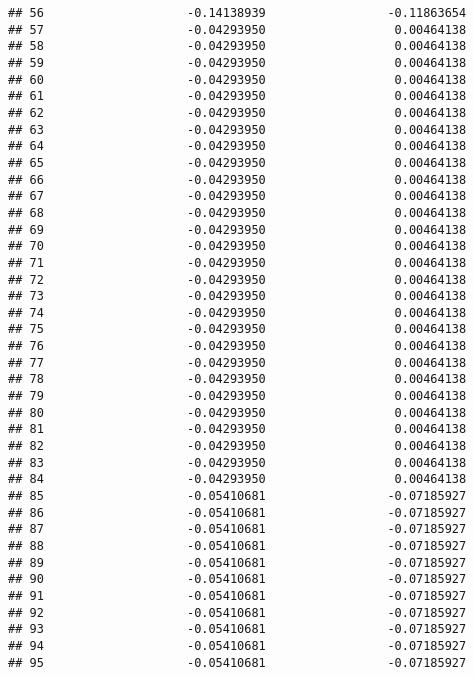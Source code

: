 \documentclass[]{article}
\begin{document}
\begin{verbatim}
## 56                    -0.14138939                 -0.11863654
## 57                    -0.04293950                  0.00464138
## 58                    -0.04293950                  0.00464138
## 59                    -0.04293950                  0.00464138
## 60                    -0.04293950                  0.00464138
## 61                    -0.04293950                  0.00464138
## 62                    -0.04293950                  0.00464138
## 63                    -0.04293950                  0.00464138
## 64                    -0.04293950                  0.00464138
## 65                    -0.04293950                  0.00464138
## 66                    -0.04293950                  0.00464138
## 67                    -0.04293950                  0.00464138
## 68                    -0.04293950                  0.00464138
## 69                    -0.04293950                  0.00464138
## 70                    -0.04293950                  0.00464138
## 71                    -0.04293950                  0.00464138
## 72                    -0.04293950                  0.00464138
## 73                    -0.04293950                  0.00464138
## 74                    -0.04293950                  0.00464138
## 75                    -0.04293950                  0.00464138
## 76                    -0.04293950                  0.00464138
## 77                    -0.04293950                  0.00464138
## 78                    -0.04293950                  0.00464138
## 79                    -0.04293950                  0.00464138
## 80                    -0.04293950                  0.00464138
## 81                    -0.04293950                  0.00464138
## 82                    -0.04293950                  0.00464138
## 83                    -0.04293950                  0.00464138
## 84                    -0.04293950                  0.00464138
## 85                    -0.05410681                 -0.07185927
## 86                    -0.05410681                 -0.07185927
## 87                    -0.05410681                 -0.07185927
## 88                    -0.05410681                 -0.07185927
## 89                    -0.05410681                 -0.07185927
## 90                    -0.05410681                 -0.07185927
## 91                    -0.05410681                 -0.07185927
## 92                    -0.05410681                 -0.07185927
## 93                    -0.05410681                 -0.07185927
## 94                    -0.05410681                 -0.07185927
## 95                    -0.05410681                 -0.07185927

\end{verbatim}
\end{document}
